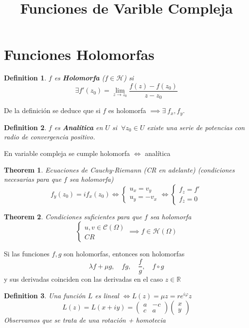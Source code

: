 \documentclass[leqno]{article}
\title{Funciones de Varible Compleja}
\newtheorem*{definition}{Definition}
\newtheorem*{theorem}{Theorem}
\begin{document}
\maketitle
\tableofcontents
\newpage

\section{Funciones Holomorfas}
\begin{definition}
$f$ es \textbf{Holomorfa} ($f\in \mathcal{H}$) si
\[
\exists f'(z_0) = \lim_{z\to z_0} \frac{f(z)-f(z_0)}{z-z_0}
\] 
\end{definition}

De la definición se deduce que si $f$ es holomorfa  $\implies \exists \ f_x, f_y$.

\begin{definition}
$f$ es  \textbf{Analítica} en $U$ si  $\ \forall z_0\in U$ existe una serie de potencias con radio de convergencia positivo.
\end{definition}

En variable compleja se cumple holomorfa  $\iff$ analítica

\begin{theorem}
Ecuaciones de Cauchy-Riemann (CR en adelante) (condiciones necesarias para que $f$ sea holomorfa)
\[
f_y(z_0) = if_x(z_0) 
\iff 
\begin{cases}
u_x = v_y \\
u_y = -v_x
\end{cases}
\iff
\begin{cases}
f_z = f'\\
f_{\overline{z}} = 0
\end{cases}
\] 
\end{theorem}

\begin{theorem}
Condiciones suficientes para que $f$ sea holomorfa
\[
\begin{cases}
  u, v\in \mathcal{C}(\Omega) \\
  CR
\end{cases}
\implies
f\in \mathcal{H}(\Omega)
\] 
\end{theorem}
Si las funciones $f, g$ son holomorfas, entonces son holomorfas
\[
\lambda f+\mu g , \quad fg, \quad \frac{f}{g}, \quad f\circ g
\] 
y sus derivadas coinciden con las derivadas en el caso $z\in \mathbb{R}$

\begin{definition}
Una función $L$ es lineal $\iff L(z) = \mu z = re^{i\varphi }z$ 
\[
  L(z) = L(x + iy) = \begin{pmatrix} a & -c \\ c & a \end{pmatrix} \begin{pmatrix} x \\ y \end{pmatrix} 
\] 
Observamos que se trata de una rotación + homotecia
\end{definition}
\end{document}
